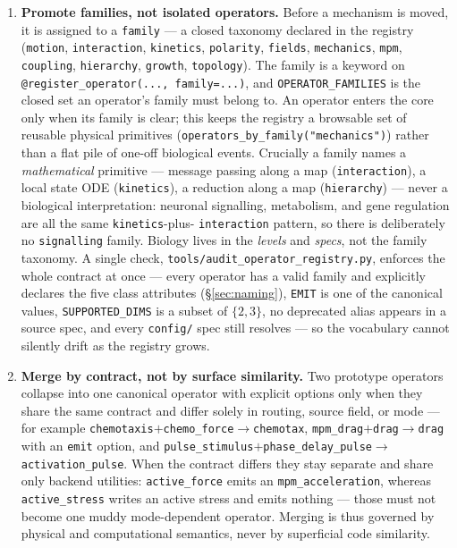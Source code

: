 \documentclass[11pt]{article}
\newcommand{\code}[1]{\texttt{#1}}
\begin{document}
\begin{enumerate}\itemsep3pt
\item \textbf{Promote families, not isolated operators.} Before a mechanism is moved,
it is assigned to a \code{family} --- a closed taxonomy declared in the registry
(\code{motion}, \code{interaction}, \code{kinetics}, \code{polarity}, \code{fields},
\code{mechanics}, \code{mpm}, \code{coupling}, \code{hierarchy}, \code{growth},
\code{topology}). The family
is a keyword on \code{@register\_operator(..., family=...)}, and \code{OPERATOR\_FAMILIES}
is the closed set an operator's family must belong to. An operator enters the core only
when its family is clear; this keeps the registry a browsable set of reusable physical
primitives (\code{operators\_by\_family("mechanics")}) rather than a flat pile of one-off
biological events. Crucially a family names a \emph{mathematical} primitive --- message
passing along a map (\code{interaction}), a local state ODE (\code{kinetics}), a
reduction along a map (\code{hierarchy}) --- never a biological interpretation: neuronal
signalling, metabolism, and gene regulation are all the same \code{kinetics}-plus-%
\code{interaction} pattern, so there is deliberately no \code{signalling} family. Biology
lives in the \emph{levels} and \emph{specs}, not the family taxonomy. A single check,
\code{tools/audit\_operator\_registry.py}, enforces the
whole contract at once --- every operator has a valid family and explicitly declares the
five class attributes (\S\ref{sec:naming}), \code{EMIT} is one of the canonical values,
\code{SUPPORTED\_DIMS} is a subset of $\{2,3\}$, no deprecated alias appears in a source
spec, and every \code{config/} spec still resolves --- so the vocabulary cannot silently
drift as the registry grows.

\item \textbf{Merge by contract, not by surface similarity.} Two prototype operators
collapse into one canonical operator with explicit options only when they share the
same contract and differ solely in routing, source field, or mode --- for example
\code{chemotaxis}$+$\code{chemo\_force}$\to$\code{chemotax},
\code{mpm\_drag}$+$\code{drag}$\to$\code{drag} with an \code{emit} option, and
\code{pulse\_stimulus}$+$\code{phase\_delay\_pulse}$\to$\code{activation\_pulse}. When
the contract differs they stay separate and share only backend utilities:
\code{active\_force} emits an \code{mpm\_acceleration}, whereas
\code{active\_stress} writes an active stress and emits nothing --- those
must not become one muddy mode-dependent operator. Merging is thus governed by
physical and computational semantics, never by superficial code similarity.


\end{enumerate}
\end{document}
